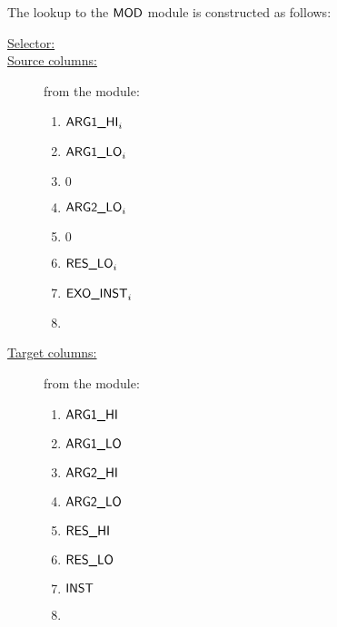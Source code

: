 The lookup to the $\textsf{MOD}$ module is constructed as follows:
\begin{description}
	\item[\underline{Selector:}] \divLookupFlag{}
	\item[\underline{Source columns:}] from the \stpMod{} module:
	\begin{multicols}{4}
	\begin{enumerate}
		\item $\textsf{ARG}\textsf{1}\textsf{\_HI}_{i}$
		\item $\textsf{ARG}\textsf{1}\textsf{\_LO}_{i}$
		\item $0$
		\item $\textsf{ARG}\textsf{2}\textsf{\_LO}_{i}$
		\item $0$
		\item $\textsf{RES}\textsf{\_LO}_{i}$
	 	\item $\textsf{EXO\_INST}_{i}$
		\item[\vspace{\fill}]
	\end{enumerate}
	\end{multicols}
\item[\underline{Target columns:}] from the \modMod{} module: 
	\begin{multicols}{4}
	\begin{enumerate}
		\item $\textsf{ARG}\textsf{1}\textsf{\_HI}$
		\item $\textsf{ARG}\textsf{1}\textsf{\_LO}$
	        \item $\textsf{ARG}\textsf{2}\textsf{\_HI}$
		\item $\textsf{ARG}\textsf{2}\textsf{\_LO}$
		\item $\textsf{RES}\textsf{\_HI}$
		\item $\textsf{RES}\textsf{\_LO}$
		\item $\textsf{INST}$
		\item[\vspace{\fill}]
	\end{enumerate} 
	\end{multicols}
\end{description}
